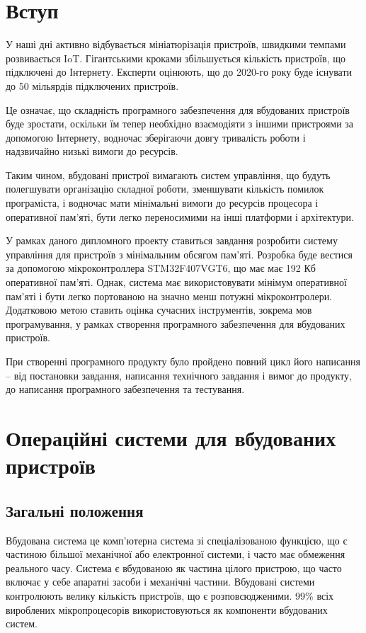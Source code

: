 \documentclass[oneside,14pt,a4paper,final]{myextreport}
\newcommand{\specialchapter}[1]{\chapter*{#1}\addcontentsline{toc}{chapter}{#1}}
\begin{document}
\specialchapter{Вступ}

У наші дні активно відбувається мініатюрізація пристроїв, швидкими темпами розвивається \ac{IoT}. Гігантськими кроками збільшується кількість пристроїв, що підключені до Інтернету. Експерти оцінюють, що до 2020-го року буде існувати до 50 мільярдів підключених пристроїв\cite{dave-evans:IoT}.

Це означає, що складність програмного забезпечення для вбудованих пристроїв буде зростати, оскільки їм тепер необхідно взаємодіяти з іншими пристроями за допомогою Інтернету, водночас зберігаючи довгу тривалість роботи і надзвичайно низькі вимоги до ресурсів.

Таким чином, вбудовані пристрої вимагають систем управління, що будуть полегшувати організацію складної роботи, зменшувати кількість помилок програміста, і водночас мати мінімальні вимоги до ресурсів процесора і оперативної пам'яті, бути легко переносимими на інші платформи і архітектури.

У рамках даного дипломного проекту ставиться завдання розробити систему управління для пристроїв з мінімальним обсягом пам'яті. Розробка буде вестися за допомогою мікроконтроллера STM32F407VGT6, що має має 192 Кб оперативної пам'яті. Однак, система має використовувати мінімум оперативної пам'яті і бути легко портованою на значно менш потужні мікроконтролери. Додатковою метою ставить оцінка сучасних інструментів, зокрема мов програмування, у рамках створення програмного забезпечення для вбудованих пристроїв.

При створенні програмного продукту було пройдено повний цикл його написання -- від постановки завдання, написання технічного завдання і вимог до продукту, до написання програмного забезпечення та тестування.

\chapter{Операційні системи для вбудованих пристроїв}
\section{Загальні положення}

Вбудована система це комп'ютерна система зі спеціалізованою функцією, що є частиною більшої механічної або електронної системи, і часто має обмеження реального часу. Система є вбудованою як частина цілого пристрою, що часто включає у себе апаратні засоби і механічні частини. Вбудовані системи контролюють велику кількість пристроїв, що є розповсюдженими. 99\% всіх вироблених мікропроцесорів використовуються як компоненти вбудованих систем.
\end{document}
